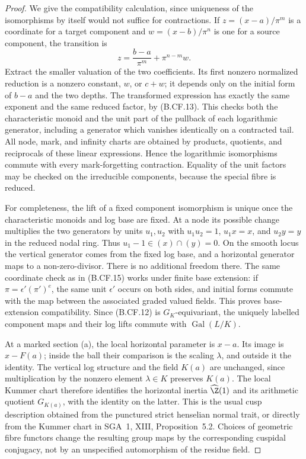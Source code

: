\begin{proof}
We give the compatibility calculation, since uniqueness of the
isomorphisms by itself would not suffice for contractions. If
\(z=(x-a)/\pi^m\) is a coordinate for a target component and
\(w=(x-b)/\pi^n\) is one for a source component, the transition is
\[
       z=\frac{b-a}{\pi^m}+\pi^{n-m}w.                   \tag{B.CF.15}
\]
Extract the smaller valuation of the two coefficients. Its first
nonzero normalized reduction is a nonzero constant, \(w\), or
\(c+w\); it depends only on the initial form of \(b-a\) and the
two depths. The transformed expression has exactly the same
exponent and the same reduced factor, by (B.CF.13). This checks
both the characteristic monoid and the unit part of the pullback
of each logarithmic generator, including a generator which
vanishes identically on a contracted tail. All node, mark, and
infinity charts are obtained by products, quotients, and
reciprocals of these linear expressions. Hence the logarithmic
isomorphisms commute with every mark-forgetting contraction.
Equality of the unit factors may be checked on the irreducible
components, because the special fibre is reduced.

For completeness, the lift of a fixed component isomorphism is
unique once the characteristic monoids and log base are fixed.
At a node its possible change multiplies the two generators by
units \(u_1,u_2\) with \(u_1u_2=1\), \(u_1x=x\), and
\(u_2y=y\) in the reduced nodal ring. Thus
\(u_1-1\in(x)\cap(y)=0\). On the smooth locus the vertical
generator comes from the fixed log base, and a horizontal generator
maps to a non-zero-divisor. There is no additional freedom there.
The same coordinate check as in (B.CF.15) works under finite base
extension: if \(\pi=\epsilon'(\pi')^e\), the same unit
\(\epsilon'\) occurs on both sides, and initial forms commute
with the map between the associated graded valued fields.
This proves base-extension compatibility. Since (B.CF.12) is
\(G_K\)-equivariant, the uniquely labelled component maps and their
log lifts commute with \(\operatorname{Gal}(L/K)\).

At a marked section (a), the local horizontal parameter is
\(x-a\). Its image is \(x-F(a)\); inside the ball their
comparison is the scaling \(\lambda\), and outside it the
identity. The vertical log structure and the field \(K(a)\)
are unchanged, since multiplication by the nonzero element
\(\lambda\in K\) preserves \(K(a)\). The local Kummer chart
therefore identifies the horizontal inertia \(\widehat\Z(1)\)
and its arithmetic quotient \(G_{K(a)}\), with the identity on
the latter. This is the usual cusp description obtained from the
punctured strict henselian normal trait, or directly from the
Kummer chart in SGA~1, XIII, Proposition~5.2. Choices of geometric
fibre functors change the resulting group maps by the corresponding
cuspidal conjugacy, not by an unspecified automorphism of the
residue field.
\end{proof}

